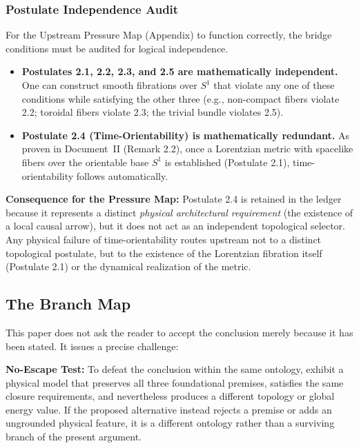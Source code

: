 \documentclass[11pt]{article}
\theoremstyle{canonstyle}
\begin{document}
\subsubsection*{Postulate Independence Audit}
For the Upstream Pressure Map (Appendix) to function correctly, the bridge conditions must be audited for logical independence. 
\begin{itemize}
    \item \textbf{Postulates 2.1, 2.2, 2.3, and 2.5 are mathematically independent.} One can construct smooth fibrations over $S^1$ that violate any one of these conditions while satisfying the other three (e.g., non-compact fibers violate 2.2; toroidal fibers violate 2.3; the trivial bundle violates 2.5).
    \item \textbf{Postulate 2.4 (Time-Orientability) is mathematically redundant.} As proven in Document~II (Remark 2.2), once a Lorentzian metric with spacelike fibers over the orientable base $S^1$ is established (Postulate 2.1), time-orientability follows automatically. 
\end{itemize}
\textbf{Consequence for the Pressure Map:} Postulate 2.4 is retained in the ledger because it represents a distinct \emph{physical architectural requirement} (the existence of a local causal arrow), but it does not act as an independent topological selector. Any physical failure of time-orientability routes upstream not to a distinct topological postulate, but to the existence of the Lorentzian fibration itself (Postulate 2.1) or the dynamical realization of the metric.

\subsection{The Branch Map}

This paper does not ask the reader to accept the conclusion merely because it has been stated. It issues a precise challenge:

\begin{keyresult}
\textbf{No-Escape Test:} To defeat the conclusion within the same ontology, exhibit a physical model that preserves all three foundational premises, satisfies the same closure requirements, and nevertheless produces a different topology or global energy value. If the proposed alternative instead rejects a premise or adds an ungrounded physical feature, it is a different ontology rather than a surviving branch of the present argument.
\end{keyresult}
\end{document}
